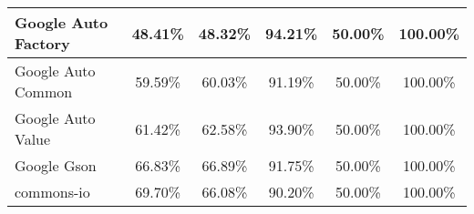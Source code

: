 \documentclass[../../main]{subfiles}
\begin{document}
\begin{table}[htb]
\begin{tabular}{|l|c|c|c|c|c|}
Google Auto Factory           & 48.41\%                                                                                 & 48.32\%                                                                                     & 94.21\%                                                                              & 50.00\%                                                                               & 100.00\%                                                                             \\ \hline
Google Auto Common            & 59.59\%                                                                                 & 60.03\%                                                                                     & 91.19\%                                                                              & 50.00\%                                                                               & 100.00\%                                                                             \\ \hline
Google Auto Value             & 61.42\%                                                                                 & 62.58\%                                                                                     & 93.90\%                                                                              & 50.00\%                                                                               & 100.00\%                                                                             \\ \hline
Google Gson                   & 66.83\%                                                                                 & 66.89\%                                                                                     & 91.75\%                                                                              & 50.00\%                                                                               & 100.00\%                                                                             \\ \hline
commons-io                    & 69.70\%                                                                                 & 66.08\%                                                                                     & 90.20\%                                                                              & 50.00\%                                                                               & 100.00\%                                                                             \\ \hline

\end{tabular}
\end{table}
\end{document}

